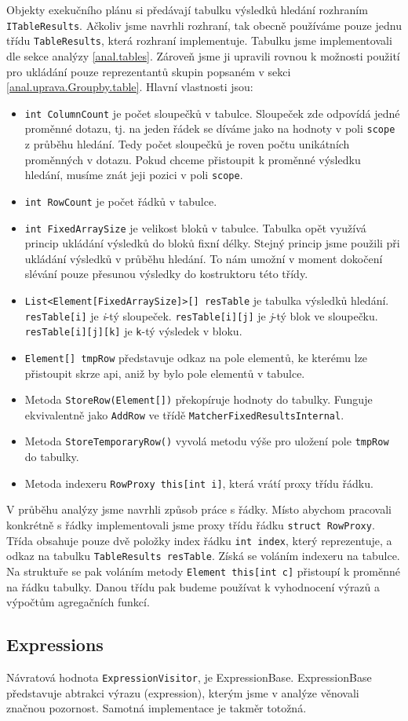 Objekty exekučního plánu si předávají tabulku výsledků hledání rozhraním \texttt{ITableResults}.
Ačkoliv jsme navrhli rozhraní, tak obecně používáme pouze jednu třídu \texttt{TableResults}, která rozhraní implementuje.
Tabulku jsme implementovali dle sekce analýzy \ref{anal.tables}.
Zároveň jsme ji upravili rovnou k možnosti použití pro ukládání pouze reprezentantů skupin popsaném v sekci \ref{anal.uprava.Groupby.table}.
Hlavní vlastnosti jsou:
\begin{itemize}
\item \texttt{int ColumnCount} je počet sloupečků v tabulce.
Sloupeček zde odpovídá jedné proměnné dotazu, tj. na jeden řádek se díváme jako na hodnoty v poli \texttt{scope} z průběhu hledání.
Tedy počet sloupečků je roven počtu unikátních proměnných v dotazu.
Pokud chceme přistoupit k proměnné výsledku hledání, musíme znát jeji pozici v poli \texttt{scope}.

\item \texttt{int RowCount} je počet řádků v tabulce.
\item \texttt{int FixedArraySize} je velikost bloků v tabulce.
Tabulka opět využívá princip ukládání výsledků do bloků fixní délky.
Stejný princip jsme použili při ukládání výsledků v průběhu hledání.
To nám umožní v moment dokočení slévání pouze přesunou výsledky do kostruktoru této třídy.
\item \texttt{List<Element[FixedArraySize]>[] resTable} je tabulka výsledků hledání.
\texttt{resTable[i]} je \textit{i}-tý sloupeček.
\texttt{resTable[i][j]} je \textit{j}-tý blok ve sloupečku.
\texttt{resTable[i][j][k]} je \texttt{k}-tý výsledek v bloku.
\item \texttt{Element[] tmpRow} představuje odkaz na pole elementů, ke kterému lze přistoupit skrze api, aniž by bylo pole elementů v tabulce.
\item Metoda \texttt{StoreRow(Element[])} překopíruje hodnoty do tabulky. Funguje ekvivalentně jako \texttt{AddRow} ve třídě \texttt{MatcherFixedResultsInternal}.
\item Metoda \texttt{StoreTemporaryRow()} vyvolá metodu výše pro uložení pole \texttt{tmpRow} do tabulky.
\item Metoda indexeru \texttt{RowProxy this[int i]}, která vrátí proxy třídu řádku.
\end{itemize}
V průběhu analýzy jsme navrhli způsob práce s řádky. 
Místo abychom pracovali konkrétně s řádky implementovali jsme proxy třídu řádku \texttt{struct RowProxy}.
Třída obsahuje pouze dvě položky index řádku \texttt{int index}, který reprezentuje, a odkaz na tabulku \texttt{TableResults resTable}.
Získá se voláním indexeru na tabulce.
Na struktuře se pak voláním metody \texttt{Element this[int c]} přistoupí k proměnné na řádku tabulky.
Danou třídu pak budeme používat k vyhodnocení výrazů a výpočtům agregačních funkcí.

\subsection{Expressions}

Návratová hodnota \texttt{ExpressionVisitor}, je ExpressionBase.
ExpressionBase představuje abtrakci výrazu (expression), kterým jsme v analýze věnovali značnou pozornost.
Samotná implementace je takměr totožná.

